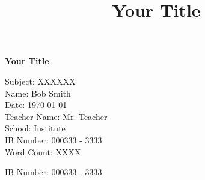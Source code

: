 \documentclass{article}
\title{Your Title}
\begin{document}
\begin{titlepage}
   \vspace{0.32\textheight}

   \begin{center}
      \Large\textbf{Your Title}\\
   \end{center}

\vspace{0.3\textheight}

\begin{flushbottom}   
\begin{flushright}

\begin{large}

    Subject: XXXXXX\\
    Name: Bob Smith\\
    Date: \today \\
    Teacher Name: Mr. Teacher \\
    School: Institute\\
    IB Number: 000333 - 3333\\
    Word Count: XXXX\\
\end{large}

\end{flushright}
\end{flushbottom}

\end{titlepage}



\begin{flushright}
IB Number: 000333 - 3333
\end{flushright}

\vspace{0.025\textheight}


\tableofcontents

\clearpage



\end{document}
